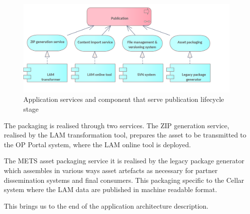 	 \begin{figure}[!h]
		\centering
		\includegraphics[width=.8\textwidth]{images/application/lifecycle/Publication.png}
		\caption{Application services and component that serve publication lifecycle stage}
		\label{fig:app-publication}
	\end{figure}

	The packaging is realised through two services. The ZIP generation service, realised by the LAM transformation tool, prepares the asset to be transmitted to the OP Portal system, where the LAM online tool is deployed. 
	
	The METS\citep{mets} asset packaging service it is realised by the legacy
	package generator which assembles in various ways asset artefacts as necessary for
partner dissemination systems and final consumers. This packaging specific to the Cellar system where the LAM data are published in machine readable format. 
	
	This brings us to the end of the application architecture description.